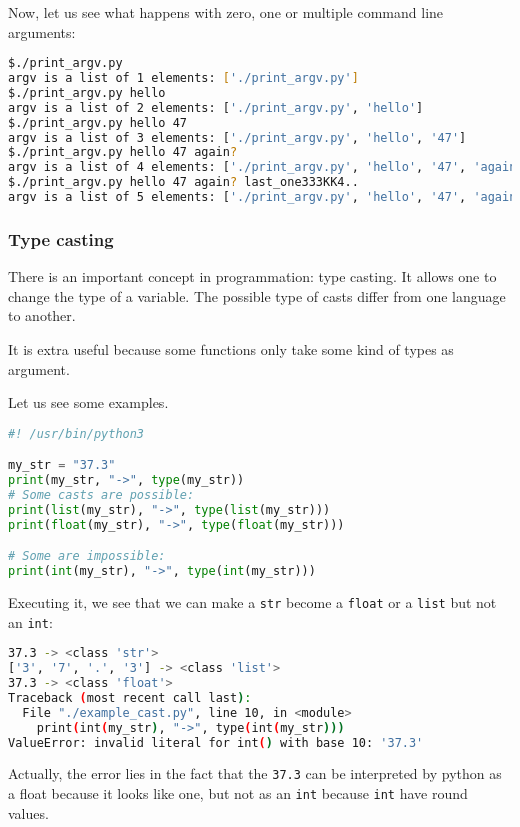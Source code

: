\documentclass[12pt]{article}
\begin{document}
Now, let us see what happens with zero, one or multiple command line arguments:

\begin{lstlisting}[language=bash]
$./print_argv.py 
argv is a list of 1 elements: ['./print_argv.py']
$./print_argv.py hello
argv is a list of 2 elements: ['./print_argv.py', 'hello']
$./print_argv.py hello 47
argv is a list of 3 elements: ['./print_argv.py', 'hello', '47']
$./print_argv.py hello 47 again?
argv is a list of 4 elements: ['./print_argv.py', 'hello', '47', 'again?']
$./print_argv.py hello 47 again? last_one333KK4..
argv is a list of 5 elements: ['./print_argv.py', 'hello', '47', 'again?', 'last_one333KK4..']
\end{lstlisting}

\subsubsection{Type casting}

There is an important concept in programmation: type casting. It allows one to change the type of a variable. The possible type of casts differ from one language to another.

It is extra useful because some functions only take some kind of types as argument.

Let us see some examples.

\begin{lstlisting}[language=python,style=codestyle,title=example\_cast.py]
#! /usr/bin/python3

my_str = "37.3"
print(my_str, "->", type(my_str))
# Some casts are possible:
print(list(my_str), "->", type(list(my_str)))
print(float(my_str), "->", type(float(my_str)))

# Some are impossible:
print(int(my_str), "->", type(int(my_str)))
\end{lstlisting}

Executing it, we see that we can make a \texttt{str} become a \texttt{float} or a \texttt{list} but not an \texttt{int}:

\begin{lstlisting}[language=bash]
37.3 -> <class 'str'>
['3', '7', '.', '3'] -> <class 'list'>
37.3 -> <class 'float'>
Traceback (most recent call last):
  File "./example_cast.py", line 10, in <module>
    print(int(my_str), "->", type(int(my_str)))
ValueError: invalid literal for int() with base 10: '37.3'
\end{lstlisting}

Actually, the error lies in the fact that the \texttt{37.3} can be interpreted by python as a float because it looks like one, but not as an \texttt{int} because \texttt{int} have round values.
\end{document}
